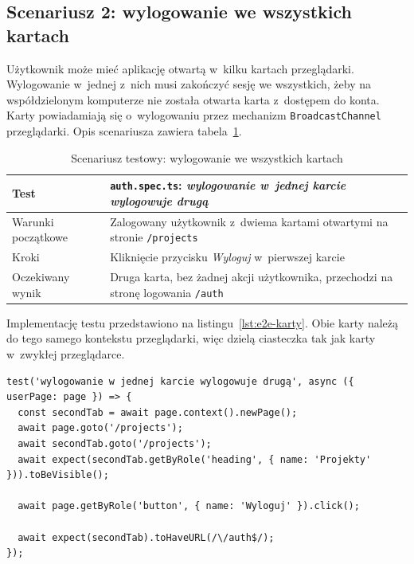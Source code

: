 \subsection{Scenariusz 2: wylogowanie we wszystkich kartach}
Użytkownik może mieć aplikację otwartą w~kilku kartach przeglądarki. Wylogowanie w~jednej z~nich musi zakończyć sesję
we wszystkich, żeby na współdzielonym komputerze nie została otwarta karta z~dostępem do konta. Karty powiadamiają się
o~wylogowaniu przez mechanizm \texttt{BroadcastChannel} przeglądarki. Opis scenariusza zawiera tabela~\ref{tab:e2e-karty}.

\begin{table}[htb]
    \centering
    \caption{Scenariusz testowy: wylogowanie we wszystkich kartach}
    \label{tab:e2e-karty}
    \small
    \begin{tabularx}{\linewidth}{@{}>{\raggedright\arraybackslash}p{3.5cm} >{\raggedright\arraybackslash}X@{}}
        \hline
        Test & \texttt{auth.spec.ts}: \textit{wylogowanie w~jednej karcie wylogowuje drugą} \\ \hline
        Warunki początkowe & Zalogowany użytkownik z~dwiema kartami otwartymi na stronie \texttt{/projects} \\ \hline
        Kroki & Kliknięcie przycisku \textit{Wyloguj} w~pierwszej karcie \\ \hline
        Oczekiwany wynik & Druga karta, bez żadnej akcji użytkownika, przechodzi na stronę logowania \texttt{/auth} \\ \hline
    \end{tabularx}
\end{table}

Implementację testu przedstawiono na listingu~\ref{lst:e2e-karty}. Obie karty należą do tego samego kontekstu
przeglądarki, więc dzielą ciasteczka tak jak karty w~zwykłej przeglądarce.

\begin{lstlisting}[basicstyle=\footnotesize\ttfamily, captionpos=t, caption={Test wylogowania w wielu kartach}, label={lst:e2e-karty}]
test('wylogowanie w jednej karcie wylogowuje drugą', async ({ userPage: page }) => {
  const secondTab = await page.context().newPage();
  await page.goto('/projects');
  await secondTab.goto('/projects');
  await expect(secondTab.getByRole('heading', { name: 'Projekty' })).toBeVisible();

  await page.getByRole('button', { name: 'Wyloguj' }).click();

  await expect(secondTab).toHaveURL(/\/auth$/);
});
\end{lstlisting}

